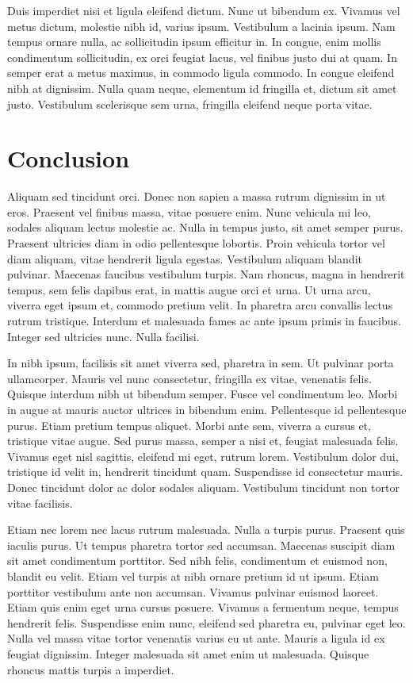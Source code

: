 \documentclass[9pt,twocolumn,twoside]{../../styles/osajnl}
\begin{document}
Duis imperdiet nisi et ligula eleifend dictum. Nunc ut bibendum
ex. Vivamus vel metus dictum, molestie nibh id, varius
ipsum. Vestibulum a lacinia ipsum. Nam tempus ornare nulla, ac
sollicitudin ipsum efficitur in. In congue, enim mollis condimentum
sollicitudin, ex orci feugiat lacus, vel finibus justo dui at quam. In
semper erat a metus maximus, in commodo ligula commodo. In congue
eleifend nibh at dignissim. Nulla quam neque, elementum id fringilla
et, dictum sit amet justo. Vestibulum scelerisque sem urna, fringilla
eleifend neque porta vitae.

\section{Conclusion}

Aliquam sed tincidunt orci. Donec non sapien a massa rutrum dignissim
in ut eros. Praesent vel finibus massa, vitae posuere enim. Nunc
vehicula mi leo, sodales aliquam lectus molestie ac. Nulla in tempus
justo, sit amet semper purus. Praesent ultricies diam in odio
pellentesque lobortis. Proin vehicula tortor vel diam aliquam, vitae
hendrerit ligula egestas. Vestibulum aliquam blandit
pulvinar. Maecenas faucibus vestibulum turpis. Nam rhoncus, magna in
hendrerit tempus, sem felis dapibus erat, in mattis augue orci et
urna. Ut urna arcu, viverra eget ipsum et, commodo pretium velit. In
pharetra arcu convallis lectus rutrum tristique. Interdum et malesuada
fames ac ante ipsum primis in faucibus. Integer sed ultricies
nunc. Nulla facilisi.

In nibh ipsum, facilisis sit amet viverra sed, pharetra in sem. Ut
pulvinar porta ullamcorper. Mauris vel nunc consectetur, fringilla ex
vitae, venenatis felis. Quisque interdum nibh ut bibendum
semper. Fusce vel condimentum leo. Morbi in augue at mauris auctor
ultrices in bibendum enim. Pellentesque id pellentesque purus. Etiam
pretium tempus aliquet. Morbi ante sem, viverra a cursus et, tristique
vitae augue. Sed purus massa, semper a nisi et, feugiat malesuada
felis. Vivamus eget nisl sagittis, eleifend mi eget, rutrum
lorem. Vestibulum dolor dui, tristique id velit in, hendrerit
tincidunt quam. Suspendisse id consectetur mauris. Donec tincidunt
dolor ac dolor sodales aliquam. Vestibulum tincidunt non tortor vitae
facilisis.

Etiam nec lorem nec lacus rutrum malesuada. Nulla a turpis
purus. Praesent quis iaculis purus. Ut tempus pharetra tortor sed
accumsan. Maecenas suscipit diam sit amet condimentum porttitor. Sed
nibh felis, condimentum et euismod non, blandit eu velit. Etiam vel
turpis at nibh ornare pretium id ut ipsum. Etiam porttitor vestibulum
ante non accumsan. Vivamus pulvinar euismod laoreet. Etiam quis enim
eget urna cursus posuere. Vivamus a fermentum neque, tempus hendrerit
felis. Suspendisse enim nunc, eleifend sed pharetra eu, pulvinar eget
leo. Nulla vel massa vitae tortor venenatis varius eu ut ante. Mauris
a ligula id ex feugiat dignissim. Integer malesuada sit amet enim ut
malesuada. Quisque rhoncus mattis turpis a imperdiet.
\end{document}
